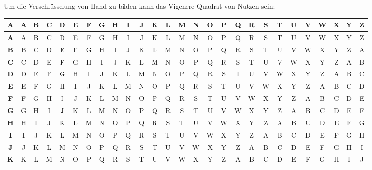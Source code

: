                     Um die Verschlüsselung von Hand zu bilden kann das Vigenere-Quadrat von Nutzen sein:
                    \begin{table}[H]
                    	\centering
                    	\tiny
                    	\begin{tabular}{|c||c|c|c|c|c|c|c|c|c|c|c|c|c|c|c|c|c|c|c|c|c|c|c|c|c|c|}
\hline
\textbf{A} & \textbf{A} & \textbf{B} & \textbf{C} & \textbf{D} & \textbf{E} & \textbf{F} & \textbf{G} & \textbf{H} & \textbf{I} & \textbf{J} & \textbf{K} & \textbf{L} & \textbf{M} & \textbf{N} & \textbf{O} & \textbf{P} & \textbf{Q} & \textbf{R} & \textbf{S} & \textbf{T} & \textbf{U} & \textbf{V} & \textbf{W} & \textbf{X} & \textbf{Y} & \textbf{Z} \\ \hline \hline
\textbf{A} & A & B & C & D & E & F & G & H & I & J & K & L & M & N & O & P & Q & R & S & T & U & V & W & X & Y & Z \\ \hline
\textbf{B} & B & C & D & E & F & G & H & I & J & K & L & M & N & O & P & Q & R & S & T & U & V & W & X & Y & Z & A \\ \hline
\textbf{C} & C & D & E & F & G & H & I & J & K & L & M & N & O & P & Q & R & S & T & U & V & W & X & Y & Z & A & B \\ \hline
\textbf{D} & D & E & F & G & H & I & J & K & L & M & N & O & P & Q & R & S & T & U & V & W & X & Y & Z & A & B & C \\ \hline
\textbf{E} & E & F & G & H & I & J & K & L & M & N & O & P & Q & R & S & T & U & V & W & X & Y & Z & A & B & C & D \\ \hline
\textbf{F} & F & G & H & I & J & K & L & M & N & O & P & Q & R & S & T & U & V & W & X & Y & Z & A & B & C & D & E \\ \hline
\textbf{G} & G & H & I & J & K & L & M & N & O & P & Q & R & S & T & U & V & W & X & Y & Z & A & B & C & D & E & F \\ \hline
\textbf{H} & H & I & J & K & L & M & N & O & P & Q & R & S & T & U & V & W & X & Y & Z & A & B & C & D & E & F & G \\ \hline
\textbf{I} & I & J & K & L & M & N & O & P & Q & R & S & T & U & V & W & X & Y & Z & A & B & C & D & E & F & G & H \\ \hline
\textbf{J} & J & K & L & M & N & O & P & Q & R & S & T & U & V & W & X & Y & Z & A & B & C & D & E & F & G & H & I \\ \hline
\textbf{K} & K & L & M & N & O & P & Q & R & S & T & U & V & W & X & Y & Z & A & B & C & D & E & F & G & H & I & J \\ \hline

\end{tabular}
\end{table}
